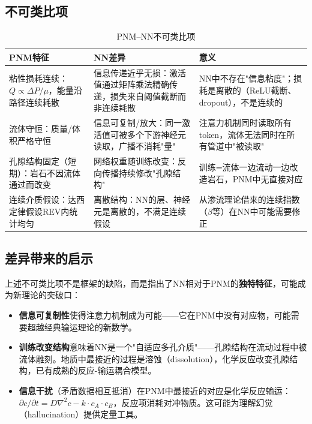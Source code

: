 \documentclass[11pt,a4paper]{article}
\begin{document}
\subsection{不可类比项}

\begin{table}[H]
\centering
\caption{PNM–NN不可类比项}
\small
\begin{tabular}{p{3.5cm}p{3.5cm}p{5cm}}
\toprule
\textbf{PNM特征} & \textbf{NN差异} & \textbf{意义} \\
\midrule
粘性损耗连续：$Q\propto\Delta P/\mu$，能量沿路径连续耗散 & 信息传递近乎无损：激活值通过矩阵乘法精确传递，损失来自阈值截断而非连续耗散 & NN中不存在"信息粘度"；损耗是离散的（ReLU截断、dropout），不是连续的 \\
\addlinespace
流体守恒：质量/体积严格守恒 & 信息可复制/放大：同一激活值可被多个下游神经元读取，广播不消耗"量" & 注意力机制同时读取所有token，流体无法同时在所有管道中"被读取" \\
\addlinespace
孔隙结构固定（短期）：岩石不因流体通过而改变 & 网络权重随训练改变：反向传播持续修改"孔隙结构" & 训练=流体一边流动一边改造岩石，PNM中无直接对应 \\
\addlinespace
连续介质假设：达西定律假设REV内统计均匀 & 离散结构：NN的层、神经元是离散的，不满足连续假设 & 从渗流理论借来的连续指数（$\beta$等）在NN中可能需要修正 \\
\bottomrule
\end{tabular}
\end{table}

\subsection{差异带来的启示}

上述不可类比项不是框架的缺陷，而是指出了NN相对于PNM的\textbf{独特特征}，可能成为新理论的突破口：

\begin{itemize}[nosep]
  \item \textbf{信息可复制性}使得注意力机制成为可能——它在PNM中没有对应物，可能需要超越经典输运理论的新数学。
  \item \textbf{训练改变结构}意味着NN是一个"自适应多孔介质"——孔隙结构在流动过程中被流体雕刻。地质中最接近的过程是溶蚀（dissolution），化学反应改变孔隙结构，已有成熟的反应-输运耦合模型。
  \item \textbf{信息干扰}（矛盾数据相互抵消）在PNM中最接近的对应是化学反应输运：$\partial c/\partial t = D\nabla^2 c - k\cdot c_A\cdot c_B$，反应项消耗对冲物质。这可能为理解幻觉（hallucination）提供定量工具。
\end{itemize}
\end{document}
